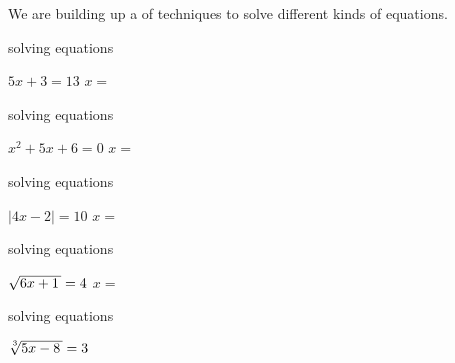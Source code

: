 \vfill 

We are building up a  of techniques to solve different kinds of equations.
\vspace{1\onelineskip}

\begin{tcbraster}[
    raster equal height, 
    raster columns = 2,
    raster column skip = 0.5in,
]
    \begin{tcolorbox}[colback=white,boxrule=0.5pt,]
        \raggedright
        {\small solving  equations \phantom{xxxxxxx}}
        \begin{center}
            \small
            $5x +3 = 13$
            \quad{\large$\Rightarrow$}\quad
            $x =$ 
        \end{center}
    \end{tcolorbox}
    \begin{tcolorbox}[colback=white,boxrule=0.5pt,]
        \raggedright
        {\small solving  equations}
        \begin{center}
            \small
            $x^2 + 5x + 6 = 0$
            \quad{\large$\Rightarrow$}\quad
            $x =$ 
        \end{center}
    \end{tcolorbox}
    \begin{tcolorbox}[colback=white,boxrule=0.5pt,]
        \raggedright
        {\small solving  equations}
        \begin{center}
            \small
            $|4x -2 | = 10$
            \quad{\large$\Rightarrow$}\quad
            $x =$ 
        \end{center}
    \end{tcolorbox}
    \begin{tcolorbox}[colback=white,boxrule=0.5pt,]
        \raggedright
        {\small solving  equations}
        \begin{center}
            \small
            $\myRoot{6x+1} = 4$
            \quad{\large$\Rightarrow$}\quad
            $x =$ 
        \end{center}
    \end{tcolorbox}
    \begin{tcolorbox}[colback=white,boxrule=0.5pt,]
        \raggedright
        {\small solving  equations}
        \begin{center}
            \small
            $\myRoot[3]{5x-8} = 3$
            \quad{\large$\Rightarrow$}\quad

\end{center}
\end{tcolorbox}
\end{tcbraster}
